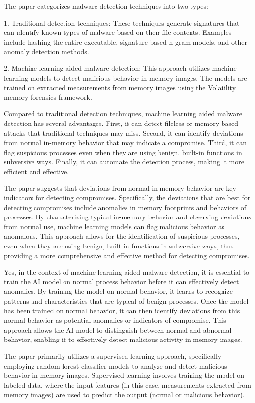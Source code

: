 \documentclass{article}
\begin{document}
The paper categorizes malware detection techniques into two types: 

1. Traditional detection techniques: These techniques generate signatures that can identify known types of malware based on their file contents. Examples include hashing the entire executable, signature-based n-gram models, and other anomaly detection methods.

2. Machine learning aided malware detection: This approach utilizes machine learning models to detect malicious behavior in memory images. The models are trained on extracted measurements from memory images using the Volatility memory forensics framework.

Compared to traditional detection techniques, machine learning aided malware detection has several advantages. First, it can detect fileless or memory-based attacks that traditional techniques may miss. Second, it can identify deviations from normal in-memory behavior that may indicate a compromise. Third, it can flag suspicious processes even when they are using benign, built-in functions in subversive ways. Finally, it can automate the detection process, making it more efficient and effective.

The paper suggests that deviations from normal in-memory behavior are key indicators for detecting compromises. Specifically, the deviations that are best for detecting compromises include anomalies in memory footprints and behaviors of processes. By characterizing typical in-memory behavior and observing deviations from normal use, machine learning models can flag malicious behavior as anomalous. This approach allows for the identification of suspicious processes, even when they are using benign, built-in functions in subversive ways, thus providing a more comprehensive and effective method for detecting compromises.

Yes, in the context of machine learning aided malware detection, it is essential to train the AI model on normal process behavior before it can effectively detect anomalies. By training the model on normal behavior, it learns to recognize patterns and characteristics that are typical of benign processes. Once the model has been trained on normal behavior, it can then identify deviations from this normal behavior as potential anomalies or indicators of compromise. This approach allows the AI model to distinguish between normal and abnormal behavior, enabling it to effectively detect malicious activity in memory images.

The paper primarily utilizes a supervised learning approach, specifically employing random forest classifier models to analyze and detect malicious behavior in memory images. Supervised learning involves training the model on labeled data, where the input features (in this case, measurements extracted from memory images) are used to predict the output (normal or malicious behavior).
\end{document}
